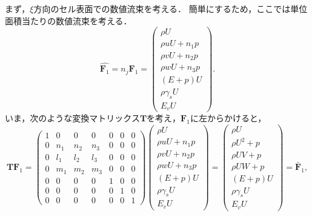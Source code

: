 まず，$\xi$方向のセル表面での数値流束を考える．
簡単にするため，ここでは単位面積当たりの数値流束を考える．
\begin{equation}
    \hat{\bm{F}_1} = n_j\bm{F}_1 =
    \begin{pmatrix}
        \rho U \\
        \rho u U + n_1p \\
        \rho v U + n_2p \\
        \rho w U + n_3p \\
        (E + p)U \\
        \rho\gamma_s U \\
        E_vU
    \end{pmatrix}.
\end{equation}
いま，次のような変換マトリックス$\bm{T}$を考え，$\hat{\bm{F}_1}$に左からかけると，
\begin{equation}
    \bm{T}\hat{\bm{F}_1} =
    \begin{pmatrix}
        1 & 0 & 0 & 0 & 0 & 0 & 0 \\
        0 & n_1 & n_2 & n_3 & 0 & 0 & 0 \\
        0 & l_1 & l_2 & l_3 & 0 & 0 & 0 \\
        0 & m_1 & m_2 & m_3 & 0 & 0 & 0 \\
        0 & 0 & 0 & 0 & 1 & 0 & 0 \\
        0 & 0 & 0 & 0 & 0 & 1 & 0 \\
        0 & 0 & 0 & 0 & 0 & 0 & 1
    \end{pmatrix}
    \begin{pmatrix}
        \rho U \\
        \rho u U + n_1p \\
        \rho v U + n_2p \\
        \rho w U + n_3p \\
        (E + p)U \\
        \rho\gamma_s U \\
        E_vU
    \end{pmatrix} =
    \begin{pmatrix}
        \rho U \\
        \rho U^2 + p \\
        \rho UV + p \\
        \rho UW + p \\
        (E + p)U \\
        \rho \gamma_sU \\
        E_v U
    \end{pmatrix} = \bar{\bm{F}}_1,
\end{equation}
